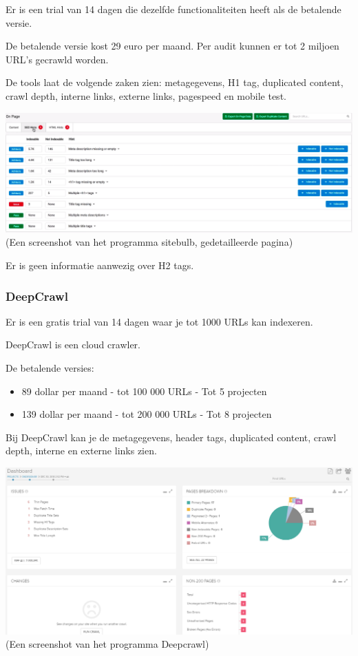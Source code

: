 Er is een trial van 14 dagen die dezelfde functionaliteiten heeft als de betalende versie. 

De betalende versie kost 29 euro per maand. Per audit kunnen er tot 2 miljoen URL's gecrawld worden. 

De tools laat de volgende zaken zien: metagegevens, H1 tag, duplicated content, crawl depth, interne links, externe links, pagespeed en mobile test. 

\includegraphics[width=\linewidth]{Bachelorproef/bachelor/img/sitebulb2.PNG}
(Een screenshot van het programma sitebulb, gedetailleerde pagina)

Er is geen informatie aanwezig over H2 tags.

\subsubsection{DeepCrawl}
\label{ch: DeepCrawl}
Er is een gratis trial van 14 dagen waar je tot 1000 URLs kan indexeren.

DeepCrawl is een cloud crawler. 

De betalende versies: 
\begin{itemize}
\item 89 dollar per maand - tot 100 000 URLs - Tot 5 projecten
\item 139 dollar per maand - tot 200 000 URLs - Tot 8 projecten
\end{itemize}

Bij DeepCrawl kan je de metagegevens, header tags, duplicated content, crawl depth, interne en externe links zien. 

\includegraphics[width=\linewidth]{Bachelorproef/bachelor/img/deepcrawl.PNG}
(Een screenshot van het programma Deepcrawl)

